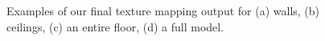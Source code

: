 \message{ !name(oldpaper.tex)}\documentclass[10pt,twocolumn,letterpaper]{article}
\begin{document}
\begin{figure}
  \centering
  ~~~~~~
  \centering

  \centering
  ~~~~~~~~
  \centering {}
  \caption{Examples of our final texture mapping output for (a) walls,
    (b) ceilings, (c) an entire floor, (d) a full model.}
  \label{fig:results}
\end{figure}

{\small   }
\end{document}
